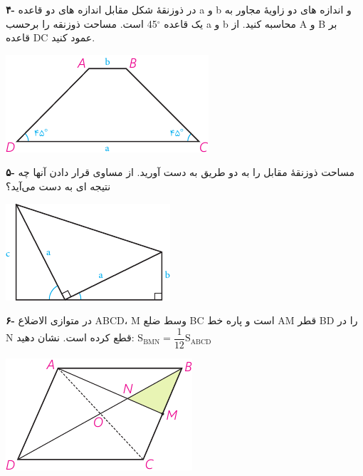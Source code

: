 \documentclass[12pt, a4paper]{book}
\newenvironment{Figure}
{\par\medskip\noindent\minipage{\linewidth}}
{\endminipage\par\medskip}
\begin{document}
\begin{multicols}{2}
\bigskip
\textbf{۴-}
در ذوزنقهٔ شکل مقابل اندازه های دو قاعده a و b و اندازه های دو زاویهٔ مجاور به یک قاعده 
$^{\circ}$45
 است. مساحت ذوزنقه را برحسب a و b محاسبه کنید. از A و B بر قاعده DC عمود کنید.

\begin{Figure}
	\centering
	\includegraphics[scale=1.2]{"Shapes/Fasl - 3/Dars 2/P72-S3.pdf"}
\end{Figure}


\bigskip
\textbf{۵-}
مساحت ذوزنقهٔ مقابل را به دو طریق به دست آورید. از مساوی قرار دادن آنها چه نتیجه ای به دست می‌آید؟

\begin{Figure}
	\centering
	\includegraphics[scale=1.2]{"Shapes/Fasl - 3/Dars 2/P72-S4.pdf"}
\end{Figure}


\bigskip
\textbf{۶-}
در متوازی الاضلاع ABCD، M وسط ضلع BC است و پاره خط AM قطر BD را در N قطع کرده است. نشان دهید: \hfill
	$
\mathrm{S}_{\mathrm{BMN}} = \dfrac{1}{12} \mathrm{S}_{\mathrm{ABCD}}
	$


\begin{Figure}
	\centering
	\includegraphics[scale=1.2]{"Shapes/Fasl - 3/Dars 2/P72-S5.pdf"}
\end{Figure}



\end{multicols}
\end{document}
